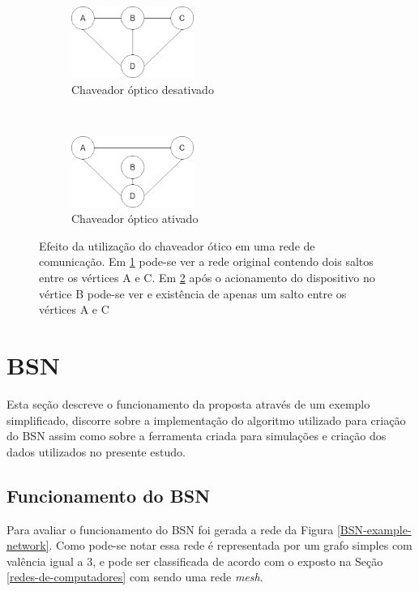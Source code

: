 \begin{figure}[t!]
	\centering
	\begin{subfigure}[t]{0.4\textwidth}
		\centering
		\includegraphics[width=4cm]{./figuras/Bypass-exemplo-A.png} %
		\caption{Chaveador óptico desativado}
		\label{fig_bypass_exemplo_A}
	\end{subfigure}%
	~
	\begin{subfigure}[t]{0.4\textwidth}
		\centering
		\includegraphics[width=4cm]{./figuras/Bypass-exemplo-B.png} %
	\caption{Chaveador óptico ativado}
	\label{fig_bypass_exemplo_B}
	\end{subfigure}
	\caption[Exemplo de atuação de \emph{by-pass} óptico]{Efeito da utilização do chaveador ótico em uma rede de comunicação. Em \ref{fig_bypass_exemplo_A} pode-se ver a rede original contendo dois saltos entre os vértices A e C. Em \ref{fig_bypass_exemplo_B} após o acionamento do dispositivo no vértice B pode-se ver e existência de apenas um salto entre os vértices A e C}
	\label{fig-bypass-exemplo}
\end{figure}

\section{BSN}
Esta seção descreve o funcionamento da proposta através de um exemplo simplificado, discorre sobre a implementação do algoritmo utilizado para criação do BSN assim como sobre a ferramenta criada para simulações e criação dos dados utilizados no presente estudo.

\subsection{Funcionamento do BSN}
Para avaliar o funcionamento do BSN foi gerada a rede da Figura \ref{BSN-example-network}. Como pode-se notar essa rede é representada por um grafo simples com valência igual a 3, e pode ser classificada de acordo com o exposto na Seção \ref{redes-de-computadores} com sendo uma rede \emph{mesh}. 

